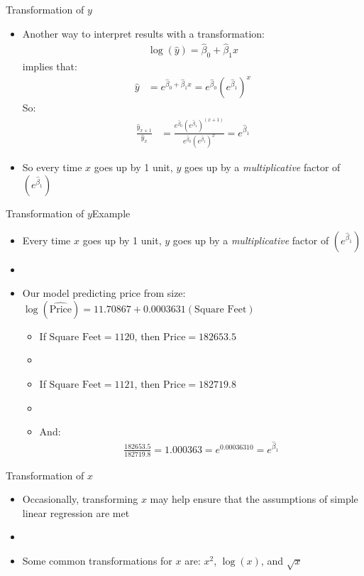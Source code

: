 \documentclass[xcolor=dvipsnames]{beamer}
\begin{document}
\begin{frame}{Transformation of $y$}
	\begin{itemize}
		\item Another way to interpret results with a transformation: \pause
		\begin{gather*}
			\log(\hat{y}) = \hat{\beta}_0 + \hat{\beta}_1x
		\end{gather*}
		implies that: \pause
		\begin{align*}
			\hat{y} &= e^{\hat{\beta}_0 + \hat{\beta}_1x } = e^{\hat{\beta}_0} (e^{\hat{\beta}_1})^x
		\end{align*}
		So: \pause
		\begin{align*}
			\frac{\hat{y}_{x+1}}{\hat{y}_{x}}&=\frac{e^{\hat{\beta}_0} (e^{\hat{\beta}_1})^{(x+1)}}{e^{\hat{\beta}_0} (e^{\hat{\beta}_1})^x} = e^{\hat{\beta}_1}
		\end{align*} \pause
		\item So every time $x$ goes up by 1 unit, $y$ goes up by a \emph{multiplicative} factor of $(e^{\hat{\beta}_1})$
	\end{itemize}
\end{frame}

\begin{frame}{Transformation of $y$}{Example}
	\begin{itemize}
		\item Every time $x$ goes up by 1 unit, $y$ goes up by a \emph{multiplicative} factor of $(e^{\hat{\beta}_1})$
		\item[]
		\item Our model predicting price from size: $\log(\hat{\text{Price}})=11.70867 + 0.0003631(\text{Square Feet})$ \pause
		\begin{itemize}
			\item If $\text{Square Feet} = 1120$, then $\text{Price}=182653.5$ \pause
			\item[]
			\item If $\text{Square Feet} = 1121$, then $\text{Price}=182719.8$ \pause
			\item[]
			\item And: \pause
			\begin{gather*}
				\frac{182653.5}{182719.8}=1.000363 = e^{0.00036310} = e^{\hat{\beta}_1}
			\end{gather*}
		\end{itemize}
	\end{itemize}
\end{frame}

\begin{frame}{Transformation of $x$}
	\begin{itemize}
		\item Occasionally, transforming $x$ may help ensure that the assumptions of simple linear regression are met
		\item[]
		\item Some common transformations for $x$ are: $x^2$, $\log(x)$, and $\sqrt{x}$
	\end{itemize}
\end{frame}
\end{document}
